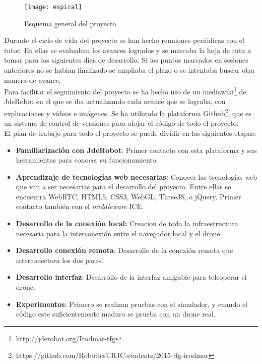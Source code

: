\begin{figure}[htb]
\centering
\texttt{[image: espiral]}
\caption{Esquema general del proyecto}
\label{fig:planificacion_espiral}
\end{figure}

Durante el ciclo de vida del proyecto se han hecho reuniones periódicas con el tutor. En ellas se evaluaban los avances logrados y se marcaba la hoja de ruta a tomar para los siguientes días de desarrollo. Si los puntos marcados en sesiones anteriores no se habian finalizado se ampliaba el plazo o se intentaba buscar otra manera de avance.\\

Para facilitar el seguimiento del proyecto se ha hecho uso de un mediawiki\footnote{http://jderobot.org/Irodmar-tfg} de JdeRobot en el que se iba actualizando cada avance que se lograba, con explicaciones y vídeos e imágenes. Se ha utilizado la plataforma Github\footnote{https://github.com/RoboticsURJC-students/2015-tfg-irodmar}, que es un sistema de control de versiones para alojar el código de todo el proyecto.\\

El plan de trabajo para todo el proyecto se puede dividir en las siguientes etapas:

\begin{itemize}
\item \textbf{Familiarización con JdeRobot}: Primer contacto con esta plataforma y sus herramientas para conocer su funcionamiento.
\item \textbf{Aprendizaje de tecnologías web necesarias:} Conocer las tecnologías web que van a ser necesarias para el desarrollo del proyecto. Entre ellas se encuentra WebRTC, HTML5, CSS3, WebGL, ThreeJS, o jQuery. Primer contacto también con el \emph{middleware} ICE.
\item \textbf{Desarrollo de la conexión local:} Creacion de toda la infraestructura necesaria para la interconexión entre el navegador local y el drone.
\item \textbf{Desarrollo conexión remota}: Desarrollo de la conexión remota que interconectara los dos pares.
\item \textbf{Desarrollo interfaz}: Desarrollo de la interfaz amigable para teleoperar el drone.
\item \textbf{Experimentos}: Primero se realizan pruebas con el simulador, y cuando el código este suficientemente maduro se prueba con un drone real.
\end{itemize}






